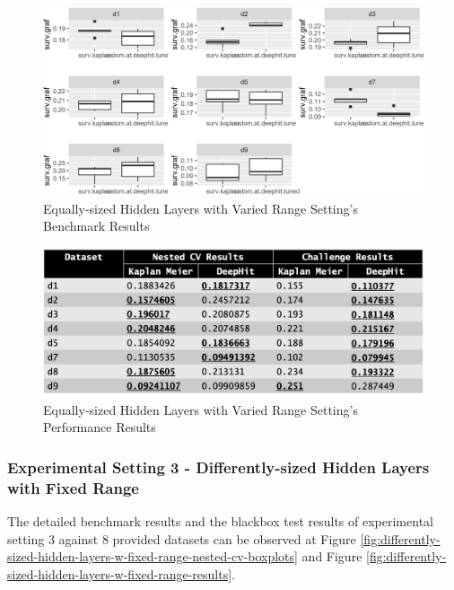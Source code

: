\documentclass[
]{article}
\begin{document}
\begin{figure}

{\centering \includegraphics[width=0.8\linewidth]{equally-sized-hidden-layers-w-varied-range-nested-cv-boxplots} 

}

\caption{Equally-sized Hidden Layers with Varied Range Setting's Benchmark Results}\label{fig:equally-sized-hidden-layers-w-varied-range-nested-cv-boxplots}
\end{figure}

\begin{figure}

{\centering \includegraphics[width=0.8\linewidth]{equally-sized-hidden-layers-w-varied-range-results} 

}

\caption{Equally-sized Hidden Layers with Varied Range Setting's Performance Results}\label{fig:equally-sized-hidden-layers-w-varied-range-results}
\end{figure}

\hypertarget{ex3}{%
\subsubsection{Experimental Setting 3 - Differently-sized Hidden Layers with Fixed Range}\label{ex3}}

The detailed benchmark results and the blackbox test results of experimental setting 3 against 8 provided datasets can be observed at Figure \ref{fig:differently-sized-hidden-layers-w-fixed-range-nested-cv-boxplots} and Figure \ref{fig:differently-sized-hidden-layers-w-fixed-range-results}.
\end{document}
